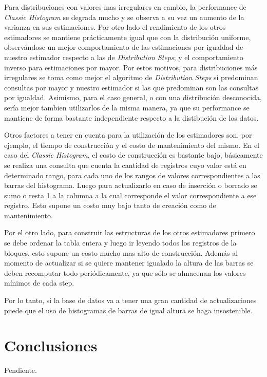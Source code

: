\documentclass[a4paper, 10pt, twoside]{article}
\begin{document}
Para distribuciones con valores mas irregulares en  cambio, la performance de \textit{Classic Histogram} se degrada mucho y se observa a su vez un aumento de la varianza
en sus estimaciones. Por otro lado el rendimiento de los otros estimadores se mantiene prácticamente igual que con la distribución uniforme, observándose un mejor comportamiento de las estimaciones por igualdad de nuestro estimador respecto a las de \textit{Distribution Steps}; y el comportamiento inverso para estimaciones por mayor.
Por estos motivos, para distribuciones más irregulares se toma como mejor el algoritmo de \textit{Distribution Steps} si predominan consultas por mayor y nuestro estimador si las que predominan son las consultas por igualdad. Asimismo, para el caso general, o con una distribución desconocida, sería mejor tambien utilizarlos de la misma manera, ya que su performance se mantiene de forma bastante independiente respecto a la distibución de los datos.

Otros factores a tener en cuenta para la utilización de los estimadores son, por ejemplo, el tiempo de construcción y el costo de mantenimiento del mismo.
En el caso del \textit{Classic Histogram}, el costo de construcción es bastante bajo, básicamente se realiza una consulta que cuenta la cantidad de registros cuyo valor está en determinado rango, para cada uno de los rangos de valores correspondientes a las barras del histograma. Luego para actualizarlo en caso de inserción o borrado se sumo o resta 1 a la columna a la cual corresponde el valor correspondiente a ese registro.
Esto supone un costo muy bajo tanto de creación como de mantenimiento.

Por el otro lado, para construir las estructuras de los otros estimadores primero se debe ordenar la tabla entera y luego ir leyendo todos los registros de la bloques. esto supone un costo mucho mas alto de construcción. Además al momento de actualizar si se quiere mantener igualado la altura de las barras se deben recomputar todo periódicamente, ya que sólo se almacenan los valores mínimos de cada step.

Por lo tanto, si la base de datos va a tener una gran cantidad de actualizaciones puede que el uso de histogramas de barras de igual altura se haga insostenible.



\section{Conclusiones}

Pendiente.
\end{document}
